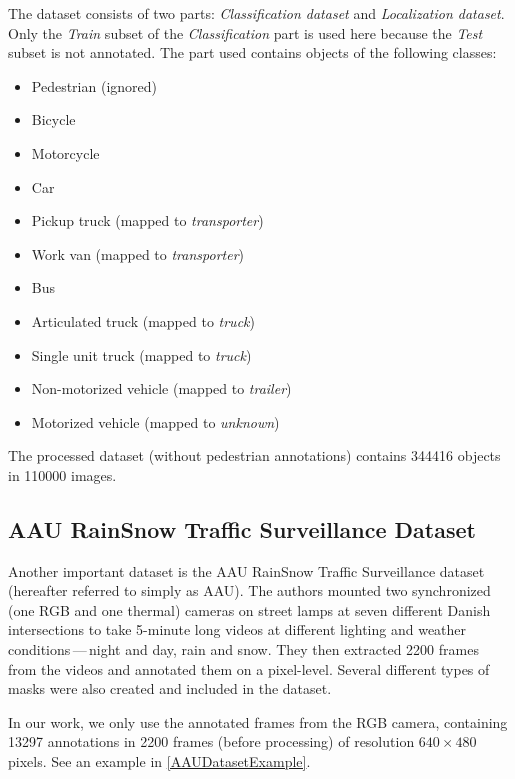 The dataset consists of two parts: \textit{Classification dataset} and
\textit{Localization dataset}. Only the \textit{Train} subset of the
\textit{Classification} part is used here because the \textit{Test} subset is
not annotated. The part used contains objects of the following classes:
\begin{itemize}
    \item Pedestrian (ignored)
    \item Bicycle
    \item Motorcycle
    \item Car
    \item Pickup truck (mapped to \textit{transporter})
    \item Work van (mapped to \textit{transporter})
    \item Bus
    \item Articulated truck (mapped to \textit{truck})
    \item Single unit truck (mapped to \textit{truck})
    \item Non-motorized vehicle (mapped to \textit{trailer})
    \item Motorized vehicle (mapped to \textit{unknown})
\end{itemize}
The processed dataset (without pedestrian annotations) contains \num{344416}
objects in \num{110000} images.



\subsection{AAU RainSnow Traffic Surveillance Dataset}
\label{AAUDataset}

Another important dataset is the AAU RainSnow Traffic Surveillance
dataset~\cite{Bahnsen2019} (hereafter referred to simply as AAU). The authors
mounted two synchronized (one RGB and one thermal) cameras on street lamps at
seven different Danish intersections to take 5-minute long videos at different
lighting and weather conditions\,---\,night and day, rain and snow. They then
extracted \num{2200} frames from the videos and annotated them on a pixel-level.
Several different types of masks were also created and included in the dataset.

In our work, we only use the annotated frames from the RGB camera, containing
\num{13297} annotations in \num{2200} frames (before processing) of resolution
$640 \times 480$ pixels. See an example in \autoref{AAUDatasetExample}.

